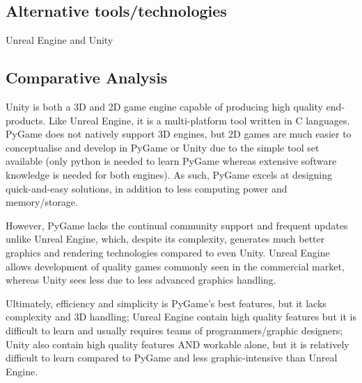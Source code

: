\documentclass[a4paper, 11pt]{report}
\begin{document}
\newpage
\newpage
\subsection{Alternative tools/technologies}
Unreal Engine and Unity
\subsection{Comparative Analysis}
Unity is both a 3D and 2D game engine capable of producing high quality end-products. Like Unreal Engine, it is a multi-platform tool written in C languages. PyGame does not natively support 3D engines, but 2D games are much easier to conceptualise and develop in PyGame or Unity due to the simple tool set available (only python is needed to learn PyGame whereas extensive software knowledge is needed for both engines). As such, PyGame excels at designing quick-and-easy solutions, in addition to less computing power and memory/storage.\cite{unity_pygame}

However, PyGame lacks the continual community support and frequent updates unlike Unreal Engine, which, despite its complexity, generates much better graphics and rendering technologies compared to even Unity. Unreal Engine allows development of quality games commonly seen in the commercial market, whereas Unity sees less due to less advanced graphics handling.\cite{unity_unreal}

Ultimately, efficiency and simplicity is PyGame's best features, but it lacks complexity and 3D handling; Unreal Engine contain high quality features but it is difficult to learn and usually requires teams of programmers/graphic designers; Unity also contain high quality features AND workable alone, but it is relatively difficult to learn compared to PyGame and less graphic-intensive than Unreal Engine.


\newpage


\end{document}

